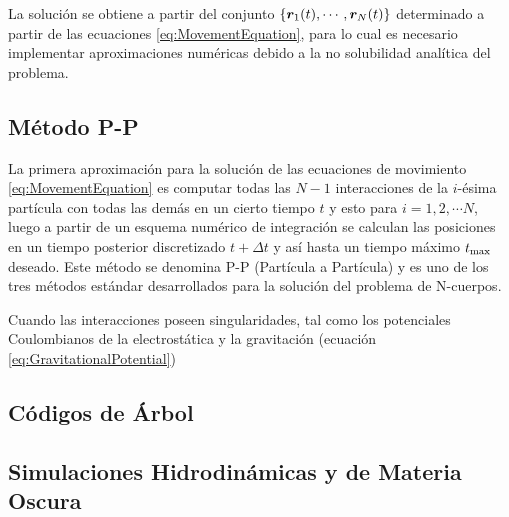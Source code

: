 La solución se obtiene a partir del conjunto $\{ \boldsymbol{ r }_1(t),\cdots, 
\boldsymbol{ r }_N(t) \}$ determinado a partir de las ecuaciones 
\ref{eq:MovementEquation}, para lo cual es necesario implementar 
aproximaciones numéricas debido a la no solubilidad analítica del problema.


	\subsection{Método P-P}
	\label{subsec:PPMethos}
	
	
La primera aproximación para la solución de las ecuaciones de movimiento
\ref{eq:MovementEquation} es computar todas las $N-1$ interacciones de la 
$i$-ésima partícula con todas las demás en un cierto tiempo $t$ y esto para 
$i=1,2,\cdots N$, luego a partir de un esquema numérico de integración se 
calculan las posiciones en un tiempo posterior discretizado $t+\Delta t$ y
así hasta un tiempo máximo $t_{\mbox{\scriptsize{max}}}$ deseado. Este método
se denomina P-P (Partícula a Partícula) y es uno de los tres métodos 
estándar desarrollados para la solución del problema de N-cuerpos.


Cuando las interacciones poseen singularidades, tal como los potenciales
Coulombianos de la electrostática y la gravitación (ecuación 
\ref{eq:GravitationalPotential})


\newpage

	\subsection{Códigos de Árbol}
	\label{subsec:TreeCodes}


	\subsection{Simulaciones Hidrodinámicas y de Materia Oscura}
	\label{subsec:HidrodynamicalAndDarkMatterSimulations}






